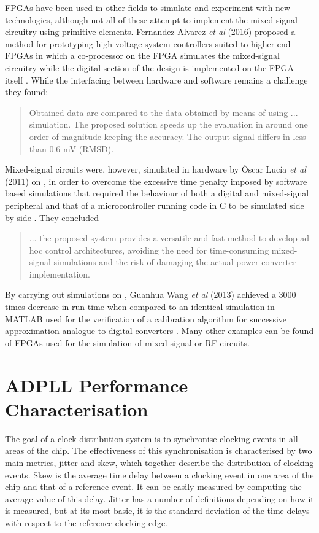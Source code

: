 \ac{FPGA}s have been used in other fields to simulate and experiment with new technologies, although not all of these attempt to implement the mixed-signal circuitry using primitive elements. Fernandez-Alvarez \textit{et al} (2016) proposed a method for prototyping high-voltage system controllers suited to higher end \ac{FPGA}s in which a co-processor on the \ac{FPGA} simulates the mixed-signal circuitry while the digital section of the design is implemented on the \ac{FPGA} itself \cite{fernandez2017hw}. While the interfacing between hardware and software remains a challenge they found:
\begin{quotation}
	Obtained data are compared to the data obtained by means of using ... simulation. The proposed solution speeds up the evaluation in around one order of magnitude keeping the accuracy. The output signal differs in less than 0.6 mV (RMSD).
\end{quotation}

Mixed-signal circuits were, however, simulated in hardware by \'{O}scar Luc\'{i}a \textit{et al} (2011) on , in order to overcome the excessive time penalty imposed by software based simulations that required the behaviour of both a digital and mixed-signal peripheral and that of a microcontroller running code in C to be simulated side by side \cite{lucia2011real}. They concluded
\begin{quotation}
	... the proposed system provides a versatile and fast method to develop ad hoc control architectures, avoiding the need for time-consuming mixed-signal simulations and the risk of damaging the actual power converter implementation.
\end{quotation}
By carrying out simulations on , Guanhua Wang \textit{et al} (2013) achieved a 3000 times decrease in run-time when compared to an identical simulation in MATLAB used for the verification of a calibration algorithm for successive approximation analogue-to-digital converters \cite{wang2013fast}. Many other examples can be found of \ac{FPGA}s used for the simulation of mixed-signal or \acs{RF} circuits.

\section{\acs{ADPLL} Performance Characterisation}
The goal of a clock distribution system is to synchronise clocking events in all areas of the chip. The effectiveness of this synchronisation is characterised by two main metrics, jitter and skew, which together describe the distribution of clocking events. Skew is the average time delay between a clocking event in one area of the chip and that of a reference event. It can be easily measured by computing the average value of this delay. Jitter has a number of definitions depending on how it is measured, but at its most basic, it is the standard deviation of the time delays with respect to the reference clocking edge.

